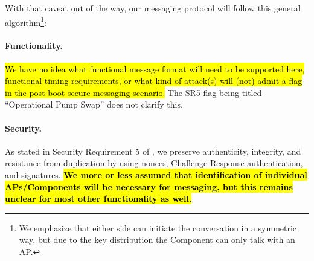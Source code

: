 With that caveat out of the way, our messaging protocol will follow this general algorithm\footnote{We emphasize that either side can initiate the conversation in a symmetric way, but due to the key distribution the Component can only talk with an AP.}:

\begin{pcimage}

\paragraph{Functionality.} \hl{We have no idea what functional message format will need to be supported here, functional timing requirements, or what kind of attack(s) will (not) admit a flag in the post-boot secure messaging scenario.} The SR5 flag being titled ``Operational Pump Swap'' does not clarify this.

\paragraph{Security.} As stated in Security Requirement 5 of \cite{eCTFOfficial}, we preserve authenticity, integrity, and resistance from duplication by using nonces, Challenge-Response authentication, and signatures. \hl{\textbf{We more or less assumed that identification of individual APs/Components will be necessary for messaging, but this remains unclear for most other functionality as well.}}

\end{pcimage}